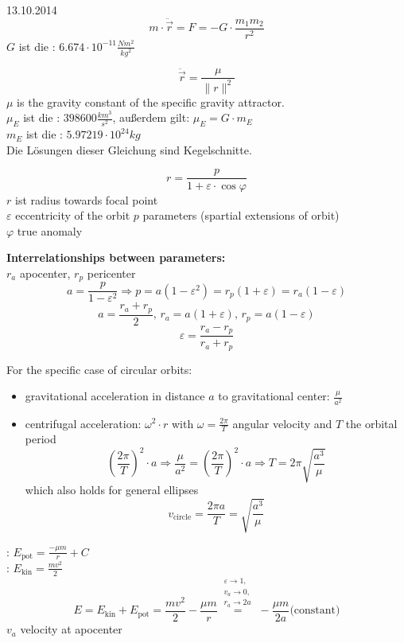 \begin{chapter}{13.10.2014}
 \[ m \cdot \ddot{\vec{r}} = F = - G \cdot \frac{m_1m_2}{r^2} \]
 $G$ ist die : $6.674 \cdot 10^{-11} \frac{Nm^2}{kg^2}$
 
 \[ \ddot{\vec{r}} = \frac{\mu}{\|r\|^2} \]
 $\mu$ is the gravity constant of the specific gravity attractor.\\
 $\mu_E$ ist die : $398600 \frac{km^3}{s^2}$, außerdem gilt: $\mu_E = G\cdot m_E$\\
 $m_E$ ist die : $5.97219 \cdot 10^{24} kg$\\
 Die Lösungen dieser Gleichung sind Kegelschnitte.
 
 \[ r = \frac{p}{1+\varepsilon\cdot\cos\varphi} \]
 $r$ ist radius towards focal point\\
 $\varepsilon$ eccentricity of the orbit
 $p$ parameters (spartial extensions of orbit)\\
 $\varphi$ true anomaly
 
 \textbf{Interrelationships between parameters:}\\
 $r_a$ apocenter, $r_p$ pericenter\\
 \[ a = \frac{p}{1-\varepsilon^2} \Rightarrow p = a(1-\varepsilon^2)= r_p(1+\varepsilon) = r_a(1-\varepsilon)\]
 \[ a = \frac{r_a+r_p}{2}\text{, } r_a = a(1+\varepsilon)\text{, }r_p=a(1-\varepsilon)\]
 \[ \varepsilon = \frac{r_a-r_p}{r_a+r_p} \]
 
 For the specific case of circular orbits:
 \begin{itemize}
  \item gravitational acceleration in distance $a$ to gravitational center: $\frac{\mu}{a^2}$
  \item centrifugal acceleration: $\omega^2\cdot r$ with $\omega = \frac{2\pi}{T}$ angular velocity and $T$ the orbital period
  \[ \left(\frac{2\pi}{T}\right)^2\cdot a \Rightarrow \frac{\mu}{a^2} = \left(\frac{2\pi}{T}\right)^2\cdot a \Rightarrow T = 2\pi\sqrt{\frac{a^3}{\mu}}\]
  which also holds for general ellipses
  \[v_\text{circle} = \frac{2\pi a}{T} = \sqrt{\frac{a^3}{\mu}} \]
 \end{itemize}

 : $E_\text{pot} = \frac{-\mu m}{r} +C$\\
 : $E_\text{kin} = \frac{m v^2}{2}$
 \[ E = E_\text{kin} + E_\text{pot} = \frac{mv^2}{2} - \frac{\mu m}{r} \stackrel{\substack{\varepsilon \rightarrow 1\text{, }\\v_a \rightarrow 0\text{, }\\r_a \rightarrow 2a}}{=} -\frac{\mu m}{2a} \text{(constant)}\]
 $v_a$ velocity at apocenter
 

\end{chapter}
